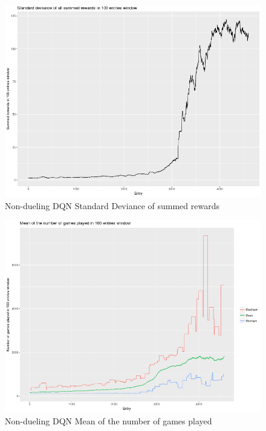 \documentclass[11pt,twoside,a4paper]{article}
\begin{document}
\begin{figure}[H]
  \includegraphics[scale=0.35]{log-analysis/dqn-nd-sd-summed-rewards.png}
  \centering
  \caption{Non-dueling DQN Standard Deviance of summed rewards}
  \label{fig:dqn-nd-sd-summed-rewards}
\end{figure}

\begin{figure}[H]
  \includegraphics[scale=0.35]{log-analysis/dqn-nd-mean-ngp.png}
  \centering
  \caption{Non-dueling DQN Mean of the number of games played}
  \label{fig:dqn-nd-mean-ngp}
\end{figure}
\end{document}
